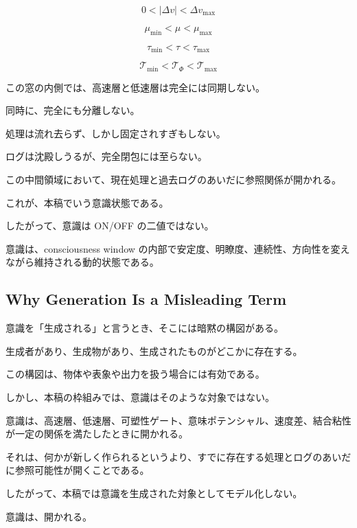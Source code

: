 \begin{equation}
0 < |\Delta v| < \Delta v_{\max}
\end{equation}

\begin{equation}
\mu_{\min} < \mu < \mu_{\max}
\end{equation}

\begin{equation}
\tau_{\min} < \tau < \tau_{\max}
\end{equation}

\begin{equation}
\mathcal{T}_{\min}
<
\mathcal{T}_{\Phi}
<
\mathcal{T}_{\max}
\end{equation}

この窓の内側では、高速層と低速層は完全には同期しない。

同時に、完全にも分離しない。

処理は流れ去らず、しかし固定されすぎもしない。

ログは沈殿しうるが、完全閉包には至らない。

この中間領域において、現在処理と過去ログのあいだに参照関係が開かれる。

これが、本稿でいう意識状態である。

したがって、意識は ON/OFF の二値ではない。

意識は、consciousness window の内部で安定度、明瞭度、連続性、方向性を変えながら維持される動的状態である。

\subsection{Why Generation Is a Misleading Term}

意識を「生成される」と言うとき、そこには暗黙の構図がある。

生成者があり、生成物があり、生成されたものがどこかに存在する。

この構図は、物体や表象や出力を扱う場合には有効である。

しかし、本稿の枠組みでは、意識はそのような対象ではない。

意識は、高速層、低速層、可塑性ゲート、意味ポテンシャル、速度差、結合粘性が一定の関係を満たしたときに開かれる。

それは、何かが新しく作られるというより、すでに存在する処理とログのあいだに参照可能性が開くことである。

したがって、本稿では意識を生成された対象としてモデル化しない。

意識は、開かれる。

